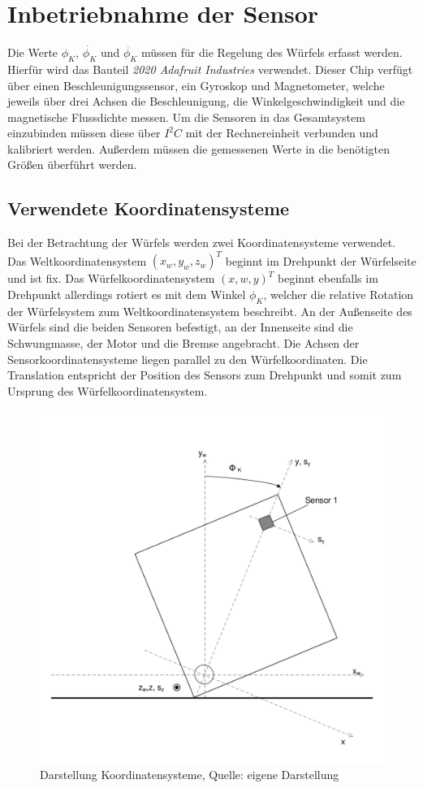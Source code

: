 \documentclass{article}
\begin{document}
\section{Inbetriebnahme der Sensor}
Die Werte $\phi_K$, $\dot{\phi_K}$ und $\ddot{\phi_K}$ müssen für die Regelung des Würfels erfasst werden. Hierfür wird das Bauteil \textit{2020 Adafruit Industries} verwendet. Dieser Chip verfügt über einen Beschleunigungssensor, ein Gyroskop und Magnetometer, welche jeweils über drei Achsen die Beschleunigung, die Winkelgeschwindigkeit und die magnetische Flussdichte messen. 
Um die Sensoren in das Gesamtsystem einzubinden müssen diese über $I^2C$ mit der Rechnereinheit verbunden und kalibriert werden. Außerdem müssen die gemessenen Werte in die benötigten Größen überführt werden.

\subsection{Verwendete Koordinatensysteme}
Bei der Betrachtung der Würfels werden zwei Koordinatensysteme verwendet. Das Weltkoordinatensystem $(x_w, y_w, z_w)^T$ beginnt im Drehpunkt der Würfelseite und ist fix. Das Würfelkoordinatensystem $(x, w, y)^T$ beginnt ebenfalls im Drehpunkt allerdings rotiert es mit dem Winkel $\phi_K$, welcher die relative Rotation der Würfelsystem zum Weltkoordinatensystem beschreibt. An der Außenseite des Würfels sind die beiden Sensoren befestigt, an der Innenseite sind die Schwungmasse, der Motor und die Bremse angebracht. Die Achsen der Sensorkoordinatensysteme liegen parallel zu den Würfelkoordinaten. Die Translation entspricht der Position des Sensors zum Drehpunkt und somit zum Ursprung des Würfelkoordinatensystem.

\begin{figure}[h]
	\includegraphics[width=\linewidth]{Koordinatensystem}
	\caption{Darstellung Koordinatensysteme, Quelle: eigene Darstellung}
\end{figure}
\end{document}
